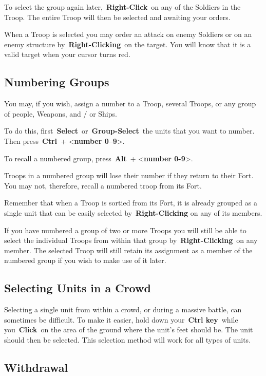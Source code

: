To select the group again later, \textbf{Right-Click} on any of the Soldiers in the Troop. The entire Troop will then be selected and awaiting your orders.

When a Troop is selected you may order an attack on enemy Soldiers or on an enemy structure by \textbf{Right-Clicking} on the target. You will know that it is a valid target when your cursor turns red.

\subsection{Numbering Groups}

You may, if you wish, assign a number to a Troop, several Troops, or any group of people, Weapons, and / or Ships.

To do this, first \textbf{Select} or \textbf{Group-Select} the units that you want to number. Then press \textbf{Ctrl} + <\textbf{number 0–9}>.

To recall a numbered group, press \textbf{Alt} + <\textbf{number 0-9}>.

Troops in a numbered group will lose their number if they return to their Fort. You may not, therefore, recall a numbered troop from its Fort.

Remember that when a Troop is sortied from its Fort, it is already grouped as a single unit that can be easily selected by \textbf{Right-Clicking} on any of its members.

If you have numbered a group of two or more Troops you will still be able to select the individual Troops from within that group by \textbf{Right-Clicking} on any member. The selected Troop will still retain its assignment as a member of the numbered group if you wish to make use of it later.

\subsection{Selecting Units in a Crowd}

Selecting a single unit from within a crowd, or during a massive battle, can sometimes be difficult. To make it easier, hold down your \textbf{Ctrl key} while you \textbf{Click} on the area of the ground where the unit’s feet should be. The unit should then be selected. This selection method will work for all types of units.

\subsection{Withdrawal}

